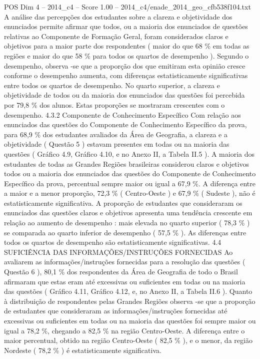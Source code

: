 \begin{textsample}{POS Dim 4 – 2014\_c4 – Score 1.00 – 2014\_c4/enade\_2014\_geo\_cfb538f104.txt}
A análise das percepções dos estudantes sobre a clareza e objetividade dos enunciados permite afirmar que todos, ou a maioria dos enunciados de questões relativas ao Componente de Formação Geral, foram considerados claros e objetivos para a maior parte dos respondentes ( maior do que 68 \% em todas as regiões e maior do que 58 \% para todos os quartos de desempenho ).
Segundo o desempenho, observa -se que a proporção dos que emitiram esta opinião cresce conforme o desempenho aumenta, com diferenças estatisticamente significativas entre todos os quartos de desempenho.
No quarto superior, a clareza e objetividade de todos ou da maioria dos enunciados das questões foi percebida por 79,8 \% dos alunos.
Estas proporções se mostraram crescentes com o desempenho. 4.3.2 Componente de Conhecimento Específico Com relação aos enunciados das questões do Componente de Conhecimento Específico da prova, para 68,9 \% dos estudantes avaliados da Área de Geografia, a clareza e a objetividade ( Questão 5 ) estavam presentes em todas ou na maioria das questões ( Gráfico 4.9, Gráfico 4.10, e no Anexo II, a Tabela II.5 ).
A maioria dos estudantes de todas as Grandes Regiões brasileiras considerou claros e objetivos todos ou a maioria dos enunciados das questões do Componente de Conhecimento Específico da prova, percentual sempre maior ou igual a 67,9 \%.
A diferença entre a maior e a menor proporção, 72,3 \% ( Centro-Oeste ) e 67,9 \% ( Sudeste ), não é estatisticamente significativa.
A proporção de estudantes que consideraram os enunciados das questões claros e objetivos apresenta uma tendência crescente em relação ao aumento de desempenho : mais elevada no quarto superior ( 78,3 \% ) se comparada ao quarto inferior de desempenho ( 57,5 \% ).
As diferenças entre todos os quartos de desempenho são estatisticamente significativas. 4.4 SUFICIÊNCIA DAS INFORMAÇÕES/INSTRUÇÕES FORNECIDAS Ao avaliarem as informações/instruções fornecidas para a resolução das questões ( Questão 6 ), 80,1 \% dos respondentes da Área de Geografia de todo o Brasil afirmaram que estas eram até excessivas ou suficientes em todas ou na maioria das questões ( Gráfico 4.11, Gráfico 4.12, e, no Anexo II, a Tabela II.6 ).
Quanto à distribuição de respondentes pelas Grandes Regiões observa -se que a proporção de estudantes que consideraram as informações/instruções fornecidas até excessivas ou suficientes em todas ou na maioria das questões foi sempre maior ou igual a 78,2 \%, chegando a 82,5 \% na região Centro-Oeste.
A diferença entre o maior percentual, obtido na região Centro-Oeste ( 82,5 \% ), e o menor, da região Nordeste ( 78,2 \% ) é estatisticamente significativa.

\end{textsample}
